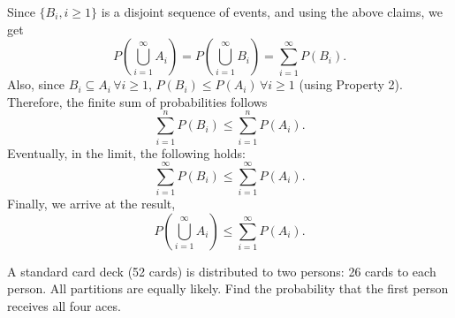 Since \( \{B_i, i \geq 1\} \) is a disjoint sequence of events, and using the above claims, we get
\[
P\left(\bigcup_{i=1}^{\infty} A_i\right) = P\left(\bigcup_{i=1}^{\infty} B_i\right) = \sum_{i=1}^{\infty} P(B_i).
\]
Also, since \( B_i \subseteq A_i \, \forall i \geq 1 \), \( P(B_i) \leq P(A_i) \, \forall i \geq 1 \) (using Property 2). Therefore, the finite sum of probabilities follows
\[
\sum_{i=1}^{n} P(B_i) \leq \sum_{i=1}^{n} P(A_i).
\]
Eventually, in the limit, the following holds:
\[
\sum_{i=1}^{\infty} P(B_i) \leq \sum_{i=1}^{\infty} P(A_i).
\]
Finally, we arrive at the result,
\[
P\left(\bigcup_{i=1}^{\infty} A_i\right) \leq \sum_{i=1}^{\infty} P(A_i).
\]

\begin{exercise}
    A standard card deck (52 cards) is distributed to two persons: 26 cards to each person. All partitions are equally likely. Find the probability that the first person receives all four aces.
\end{exercise}

